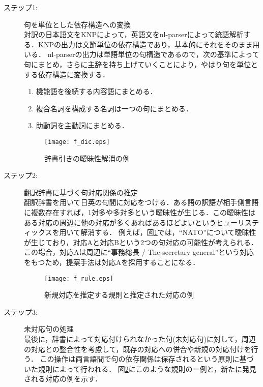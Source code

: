 \documentclass{nlp}
\begin{document}
\begin{description}
 \item[ステップ1:] 句を単位とした依存構造への変換\\
対訳の日本語文をKNP\cite{Kurohashi1994}によって，英語文をnl-parser\cite{Charniak2000}によって統語解析する．KNPの出力は文節単位の依存構造であり，基本的にそれをそのまま用いる．
nl-parserの出力は単語単位の句構造であるので，次の基準によって句にまとめ，さらに主辞を持ち上げていくことにより，やはり句を単位とする依存構造に変換する．
\begin{enumerate}
\item 機能語を後続する内容語にまとめる．
\item 複合名詞を構成する名詞は一つの句にまとめる．
\item 助動詞を主動詞にまとめる．
\end{enumerate}

\begin{figure}
\begin{center}
\texttt{[image: f\_dic.eps]}
\end{center}
\caption{辞書引きの曖昧性解消の例}
\label{f_dic.eps}
\end{figure}

 \item[ステップ2:] 翻訳辞書に基づく句対応関係の推定\\
翻訳辞書を用いて日英の句間に対応をつける．ある語の訳語が相手側言語に複数存在すれば，1対多や多対多という曖昧性が生じる．この曖昧性はある対応の周辺に他の対応が多くあればあるほどよいというヒューリスティックスを用いて解消する．
例えば，図\ref{f_dic.eps}では，``NATO''について曖昧性が生じており，対応Aと対応Bという2つの句対応の可能性が考えられる．
この場合，対応Aは周辺に``事務総長 / The secretary general''という対応をもつため，提案手法は対応Aを採用することになる．

\begin{figure}
\begin{center}
\texttt{[image: f\_rule.eps]}
\end{center}
\caption{新規対応を推定する規則と推定された対応の例}
\label{f_rule.eps}
\end{figure}

 \item[ステップ3:] 未対応句の処理\\
最後に，辞書によって対応付けられなかった句(未対応句)に対して，周辺の対応との整合性を考慮して，既存の対応への併合や新規の対応付けを行う．
この操作は両言語間で句の依存関係は保存されるという原則に基づいた規則によって行われる．
図\ref{f_rule.eps}にこのような規則の一例と，新たに発見される対応の例を示す．
\end{description}
\end{document}
